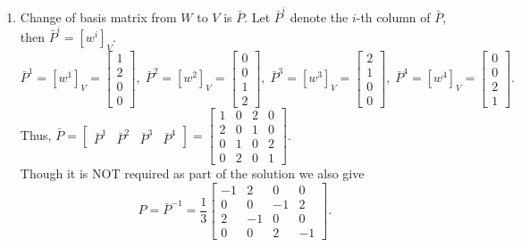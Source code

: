 \documentclass[letterpaper]{article}
\begin{document}
\begin{enumerate}
\item Change of basis matrix from $W$ to $V$ is $\bar{P}$. Let $\bar{P}^{i}$ denote the $i$-th column of $\bar{P}$, then $\bar{P}^{i}=[w^{i}]_{V}$.
    \begin{equation*}
      \bar{P}^{1}=[w^{1}]_{V}=\begin{bmatrix}1\\ 2\\ 0 \\ 0\end{bmatrix},\;
      \bar{P}^{2}=[w^{2}]_{V}=\begin{bmatrix} 0 \\ 0 \\1\\ 2\end{bmatrix},\;
      \bar{P}^{3}=[w^{3}]_{V}=\begin{bmatrix}2\\ 1\\ 0 \\ 0\end{bmatrix},\;
      \bar{P}^{4}=[w^{4}]_{V}=\begin{bmatrix} 0 \\ 0 \\2\\ 1\end{bmatrix}.
    \end{equation*}
    Thus, $\bar{P}=\begin{bmatrix}\bar{P}^{1} & \bar{P}^{2} & \bar{P}^{3} & \bar{P}^{4} \end{bmatrix}
    =\begin{bmatrix}1 & 0 & 2 &0\\2& 0 & 1 & 0 \\0 &1 & 0 & 2\\0& 2 & 0 & 1\end{bmatrix}.$\\

    Though it is NOT required as part of the solution we also give
    $$P=\bar{P}^{-1}=\dfrac{1}{3}\begin{bmatrix}-1& 2 & 0 & 0\\0 & 0 &-1&2\\2 & -1 & 0 & 0\\ 0 & 0 & 2 &-1\end{bmatrix}.$$
\end{enumerate}
\end{document}
